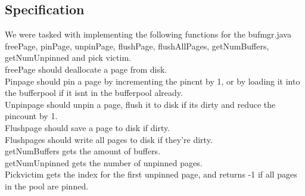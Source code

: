 \documentclass[a4paper,10pt,titlepage]{report}
\begin{document}
\subsection{Specification}
We were tasked with implementing the following functions for the bufmgr.java\\

freePage, pinPage, unpinPage, flushPage, flushAllPages, getNumBuffers, getNumUnpinned and pick victim. \\

freePage should deallocate a page from disk.\\

Pinpage should pin a page by incrementing the pincnt by 1, or by loading it into the bufferpool if it isnt in the bufferpool already.\\

Unpinpage should unpin a page, flush it to disk if its dirty and reduce the pincount by 1.\\

Flushpage should save a page to disk if dirty.\\

Flushpages should write all pages to disk if they're dirty.\\

getNumBuffers gets the amount of buffers.\\

getNumUnpinned gets the number of unpinned pages.\\

Pickvictim gets the index for the first unpinned page, and returns -1 if all pages in the pool are pinned.

%
\end{document}
